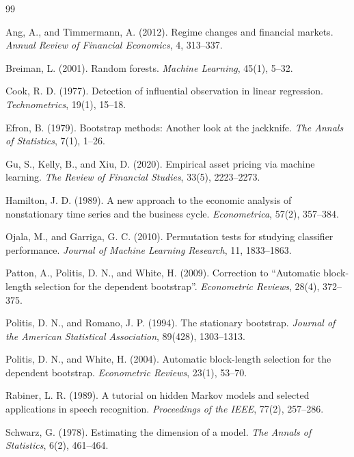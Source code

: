 \documentclass[11pt,a4paper]{article}
\begin{document}
\small
\begin{thebibliography}{99}

Ang, A., and Timmermann, A. (2012). Regime changes and financial markets.
\emph{Annual Review of Financial Economics}, 4, 313--337.

Breiman, L. (2001). Random forests. \emph{Machine Learning}, 45(1), 5--32.

Cook, R. D. (1977). Detection of influential observation in linear regression.
\emph{Technometrics}, 19(1), 15--18.

Efron, B. (1979). Bootstrap methods: Another look at the jackknife.
\emph{The Annals of Statistics}, 7(1), 1--26.

Gu, S., Kelly, B., and Xiu, D. (2020). Empirical asset pricing via machine learning.
\emph{The Review of Financial Studies}, 33(5), 2223--2273.

Hamilton, J. D. (1989). A new approach to the economic analysis of nonstationary time series
and the business cycle. \emph{Econometrica}, 57(2), 357--384.

Ojala, M., and Garriga, G. C. (2010). Permutation tests for studying classifier performance.
\emph{Journal of Machine Learning Research}, 11, 1833--1863.

Patton, A., Politis, D. N., and White, H. (2009). Correction to ``Automatic block-length
selection for the dependent bootstrap''. \emph{Econometric Reviews}, 28(4), 372--375.

Politis, D. N., and Romano, J. P. (1994). The stationary bootstrap.
\emph{Journal of the American Statistical Association}, 89(428), 1303--1313.

Politis, D. N., and White, H. (2004). Automatic block-length selection for the dependent
bootstrap. \emph{Econometric Reviews}, 23(1), 53--70.

Rabiner, L. R. (1989). A tutorial on hidden Markov models and selected applications in speech
recognition. \emph{Proceedings of the IEEE}, 77(2), 257--286.

Schwarz, G. (1978). Estimating the dimension of a model.
\emph{The Annals of Statistics}, 6(2), 461--464.

\end{thebibliography}
\end{document}
